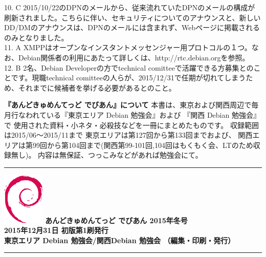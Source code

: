 \documentclass[mingoth,a4paper]{jsarticle}
\begin{document}
10. C 2015/10/22のDPNのメールから、従来流れていたDPNのメールの構成が刷新されました。こちらに伴い、セキュリティについてのアナウンスと、新しいDD/DMのアナウンスは、DPNのメールには含まれず、Webページに掲載されるのみとなりました。\\
11. A XMPPはオープンなインスタントメッセンジャー用プロトコルの１つ。なお、Debian関係者の利用にあたって詳しくは、http://rtc.debian.orgを参照。\\
12. B 2名、Debian Developerの方でtechnical comitteeで活躍できる方募集とのことです。現職technical comitteeの人らが、2015/12/31で任期が切れてしまうため、それまでに候補者を挙げる必要があるとのこと。


\newpage
\thispagestyle{empty}\mbox{}
\newpage

\thispagestyle{empty}
{
\large
\begin{itembox}{\bf 『あんどきゅめんてっど でびあん』について}
本書は、東京および関西周辺で毎月行なわれている『東京エリア Debian 勉強会』および
『関西 Debian 勉強会』で
使用された資料・小ネタ・必殺技などを一冊にまとめたものです。
収録範囲は2015/06〜2015/11まで
東京エリアは第127回から第133回までおよび、
関西エリアは第99回から第104回まで(関西第99-101回,104回はもくもく会、LTのため収録無し)。
内容は無保証、つっこみなどがあれば勉強会にて。
\end{itembox}
}

\vspace*{13cm}
{\color{dancerlightblue}\rule{\hsize}{1mm}}
\vspace{2mm}
\includegraphics[width=2cm]{image200502/openlogo-nd.eps}
\noindent \Large \bf あんどきゅめんてっど でびあん 2015年冬号\\
\noindent \normalfont 2015年12月31日 \hspace{5mm}  初版第1刷発行\\
\noindent \normalfont 東京エリア Debian 勉強会/関西Debian 勉強会 （編集・印刷・発行）\\
{\color{dancerdarkblue}\rule{\hsize}{1mm}}
\end{document}
